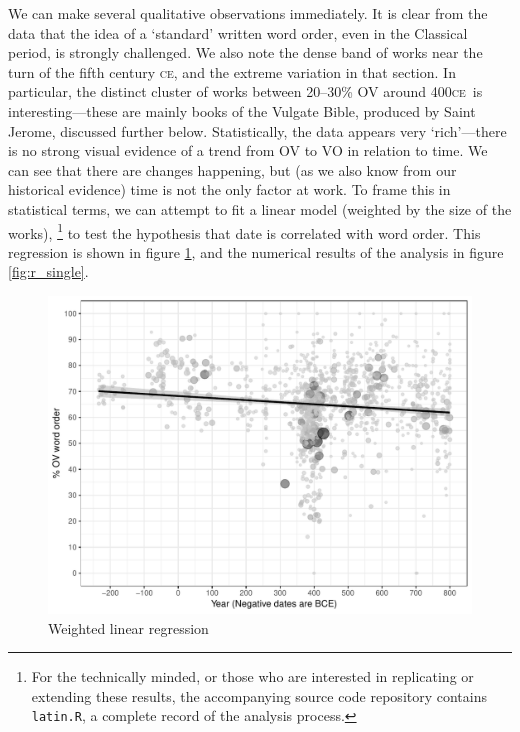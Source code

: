 \documentclass[11pt,a4paper]{scrartcl} %
\newcommand{\ce}{\textsc{ce}\ }
\begin{document}
\noindent We can make several qualitative observations immediately. It is clear from the data that the idea of a  `standard' written word order, even in the Classical period, is strongly challenged. We also note the dense band of works near the turn of the fifth century \textsc{ce}, and the extreme variation in that section. In particular, the distinct cluster of works between 20--30\% OV around 400\ce is interesting---these are mainly books of the Vulgate Bible, produced by Saint Jerome, discussed further below. Statistically, the data appears very `rich'---there is no strong visual evidence of a trend from OV to VO in relation to time. We can see that there are changes happening, but (as we also know from our historical evidence) time is not the only factor at work. To frame this in statistical terms, we can attempt to fit a linear model (weighted by the size of the works),
\footnote{For the technically minded, or those who are interested in replicating or extending these results, the accompanying source code repository contains \texttt{latin.R}, a complete record of the analysis process.}
 to test the hypothesis that date is correlated with word order. This regression is shown in figure \ref{fig:sp_single_lm}, and the numerical results of the analysis in figure \ref{fig:r_single}.

\begin{figure}[H]
    \caption{Weighted linear regression}
    \label{fig:sp_single_lm}
    \includegraphics[width=\textwidth]{sp_single_lm.pdf}
\end{figure}
\end{document}
